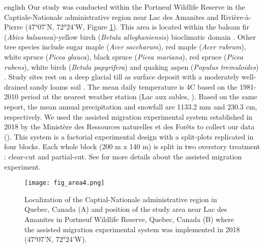 \begin{otherlanguage*}{english}
  Our study was conducted within the Portneuf Wildlife Reserve in the Captiale-Nationale administrative region near Lac des Amanites and Rivière-à-Pierre (47°07'N, 72°24'W, Figure \ref{fig:area}). 
  This area is located within the balsam fir (\textit{Abies balsamea})-yellow birch (\textit{Betula alleghaniensis}) bioclimatic domain \citep{saucierChapitreEcologieForestiere2009}.
  Other tree species include sugar maple (\textit{Acer saccharum}), red maple (\textit{Acer rubrum}), white spruce (\textit{Picea glauca}), black spruce (\textit{Picea mariana}), red spruce (\textit{Picea rubens}), white birch (\textit{Betula papyrifera}) and quaking aspen (\textit{Populus tremuloides}) \citep{olaBelowgroundCarbonStocks2024}. 
  Study sites rest on a deep glacial till as surface deposit with a moderately well-drained sandy loams soil \citep{CanadianSystemSoil1998}.
  The mean daily temperature is 4C based on the 1981-2010 period at the nearest weather station (Lac aux sables, \citealp{environmentcanadaCanadianClimateNormals2019}). 
  Based on the same report, the mean annual precipitation and snowfall are 1133.2 mm and 230.3 cm, respectively.
  We used the assisted migration experimental system established in 2018 by the Ministère des Ressources naturelles et des Forêts to collect our data (\citealp{royoDesiredREgenerationAssisted2023}).
  This system is a factorial experimental design with a split-plots replicated in four blocks. 
  Each whole block (200 m x 140 m) is split in two overstory treatment : clear-cut and partial-cut. 
  See \cite{royoDesiredREgenerationAssisted2023} for more details about the assisted migration experiment.

\end{otherlanguage*}

\begin{figure}[ht!]
	\centering
	\texttt{[image: fig\_area4.png]}
	\caption[Localization of the Captiale-Nationale administrative region in Quebec, Canada and position of the study area near Lac des Amanites in Portneuf Wildlife Reserve, Quebec, Canada.]
  {Localization of the Captial-Nationale administrative region in Quebec, Canada (A) and position of the study area near Lac des Amanites in Portneuf Wildlife Reserve, Quebec, Canada (B) where the assisted migration experimental system was implemented in 2018 (47°07'N, 72°24'W).}
	\label{fig:area}
	\end{figure}  



